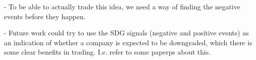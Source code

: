 - To be able to actually trade this idea, we need a way of finding the negative events before they happen. 

- Future work could try to use the SDG signals (negative and positive events) as an indication of whether a company is expected to be downgraded, which there is some clear benefits in trading. I.e. refer to some paperps about this. 